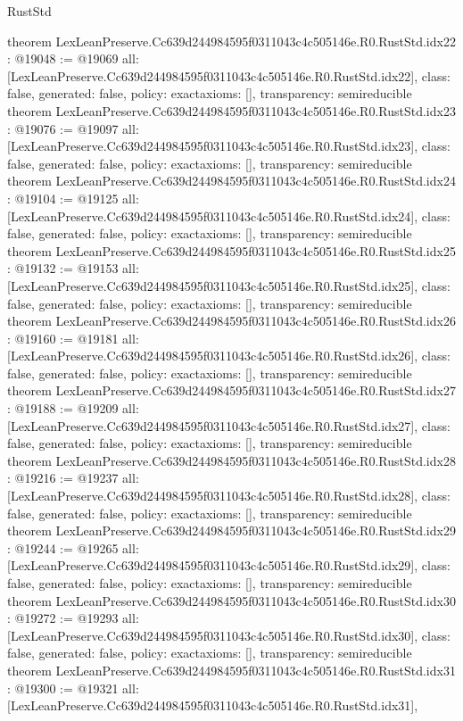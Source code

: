 \begin{lexlean}{RustStd}
\begin{coremodule}
{}
theorem LexLeanPreserve.Cc639d244984595f0311043c4c505146e.R0.RustStd.idx22 : @19048 := @19069 {
  all: [LexLeanPreserve.Cc639d244984595f0311043c4c505146e.R0.RustStd.idx22],
  class: false,
  generated: false,
  policy: exact{axioms: []},
  transparency: semireducible
}
theorem LexLeanPreserve.Cc639d244984595f0311043c4c505146e.R0.RustStd.idx23 : @19076 := @19097 {
  all: [LexLeanPreserve.Cc639d244984595f0311043c4c505146e.R0.RustStd.idx23],
  class: false,
  generated: false,
  policy: exact{axioms: []},
  transparency: semireducible
}
theorem LexLeanPreserve.Cc639d244984595f0311043c4c505146e.R0.RustStd.idx24 : @19104 := @19125 {
  all: [LexLeanPreserve.Cc639d244984595f0311043c4c505146e.R0.RustStd.idx24],
  class: false,
  generated: false,
  policy: exact{axioms: []},
  transparency: semireducible
}
theorem LexLeanPreserve.Cc639d244984595f0311043c4c505146e.R0.RustStd.idx25 : @19132 := @19153 {
  all: [LexLeanPreserve.Cc639d244984595f0311043c4c505146e.R0.RustStd.idx25],
  class: false,
  generated: false,
  policy: exact{axioms: []},
  transparency: semireducible
}
theorem LexLeanPreserve.Cc639d244984595f0311043c4c505146e.R0.RustStd.idx26 : @19160 := @19181 {
  all: [LexLeanPreserve.Cc639d244984595f0311043c4c505146e.R0.RustStd.idx26],
  class: false,
  generated: false,
  policy: exact{axioms: []},
  transparency: semireducible
}
theorem LexLeanPreserve.Cc639d244984595f0311043c4c505146e.R0.RustStd.idx27 : @19188 := @19209 {
  all: [LexLeanPreserve.Cc639d244984595f0311043c4c505146e.R0.RustStd.idx27],
  class: false,
  generated: false,
  policy: exact{axioms: []},
  transparency: semireducible
}
theorem LexLeanPreserve.Cc639d244984595f0311043c4c505146e.R0.RustStd.idx28 : @19216 := @19237 {
  all: [LexLeanPreserve.Cc639d244984595f0311043c4c505146e.R0.RustStd.idx28],
  class: false,
  generated: false,
  policy: exact{axioms: []},
  transparency: semireducible
}
theorem LexLeanPreserve.Cc639d244984595f0311043c4c505146e.R0.RustStd.idx29 : @19244 := @19265 {
  all: [LexLeanPreserve.Cc639d244984595f0311043c4c505146e.R0.RustStd.idx29],
  class: false,
  generated: false,
  policy: exact{axioms: []},
  transparency: semireducible
}
theorem LexLeanPreserve.Cc639d244984595f0311043c4c505146e.R0.RustStd.idx30 : @19272 := @19293 {
  all: [LexLeanPreserve.Cc639d244984595f0311043c4c505146e.R0.RustStd.idx30],
  class: false,
  generated: false,
  policy: exact{axioms: []},
  transparency: semireducible
}
theorem LexLeanPreserve.Cc639d244984595f0311043c4c505146e.R0.RustStd.idx31 : @19300 := @19321 {
  all: [LexLeanPreserve.Cc639d244984595f0311043c4c505146e.R0.RustStd.idx31],
}
\end{coremodule}
\end{lexlean}
